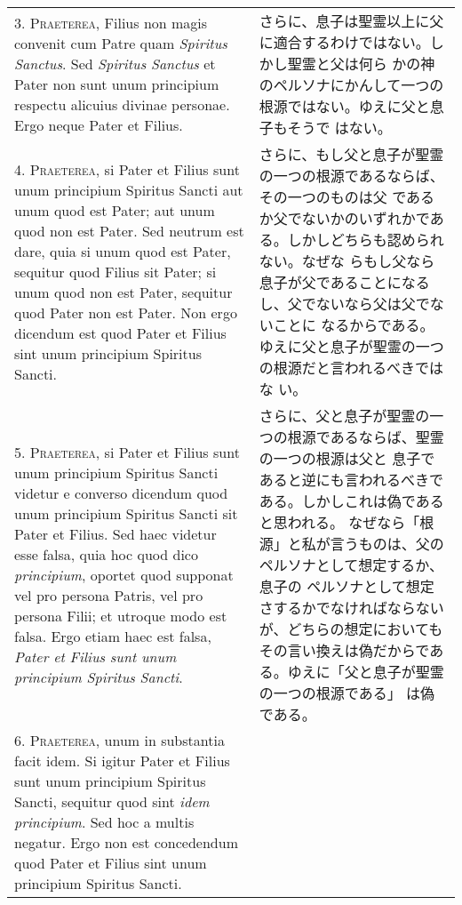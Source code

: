 \documentclass[10pt]{jsarticle} %
\begin{document}
\begin{longtable}{p{21em}p{21em}}
3. {\scshape Praeterea}, Filius non magis convenit cum Patre quam {\itshape
Spiritus Sanctus}. Sed {\itshape  Spiritus Sanctus} et Pater non sunt
unum principium respectu alicuius divinae personae. Ergo neque Pater
et Filius.

&

さらに、息子は聖霊以上に父に適合するわけではない。しかし聖霊と父は何ら
 かの神のペルソナにかんして一つの根源ではない。ゆえに父と息子もそうで
 はない。

\\



4. {\scshape Praeterea}, si Pater et Filius sunt unum principium  Spiritus Sancti
aut unum quod est Pater; aut unum quod non est Pater. Sed neutrum est
dare, quia si unum quod est Pater, sequitur quod Filius sit Pater; si
unum quod non est Pater, sequitur quod Pater non est Pater. Non ergo
dicendum est quod Pater et Filius sint unum principium  Spiritus
Sancti.

&

さらに、もし父と息子が聖霊の一つの根源であるならば、その一つのものは父
であるか父でないかのいずれかである。しかしどちらも認められない。なぜな
らもし父なら息子が父であることになるし、父でないなら父は父でないことに
なるからである。ゆえに父と息子が聖霊の一つの根源だと言われるべきではな
い。

\\



5. {\scshape Praeterea}, si Pater et Filius sunt unum principium  Spiritus Sancti
videtur e converso dicendum quod unum principium  Spiritus Sancti sit
Pater et Filius. Sed haec videtur esse falsa, quia hoc quod dico
{\itshape principium}, oportet quod supponat vel pro persona Patris, vel pro
persona Filii; et utroque modo est falsa. Ergo etiam haec est falsa,
{\itshape Pater et Filius sunt unum principium  Spiritus Sancti}.

&

さらに、父と息子が聖霊の一つの根源であるならば、聖霊の一つの根源は父と
息子であると逆にも言われるべきである。しかしこれは偽であると思われる。
なぜなら「根源」と私が言うものは、父のペルソナとして想定するか、息子の
ペルソナとして想定さするかでなければならないが、どちらの想定においても
その言い換えは偽だからである。ゆえに「父と息子が聖霊の一つの根源である」
は偽である。

\\



6. {\scshape Praeterea}, unum in substantia facit idem. Si igitur Pater et Filius
sunt unum principium  Spiritus Sancti, sequitur quod sint {\itshape idem
principium}. Sed hoc a multis negatur. Ergo non est concedendum quod
Pater et Filius sint unum principium  Spiritus Sancti.


\end{longtable}
\end{document}
